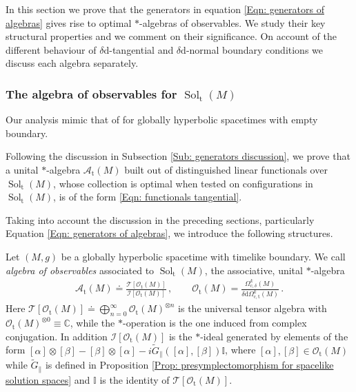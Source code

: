 In this section we prove that the generators in equation \eqref{Eqn: generators of algebras} gives rise to optimal $*$-algebras of observables. We study their key structural properties and we comment on their significance. On account of the different behaviour of $\delta\mathrm{d}$-tangential and $\delta\mathrm{d}$-normal boundary conditions we discuss each algebra separately.

\subsubsection{The algebra of observables for $\operatorname{Sol}_{\mathrm{t}}(M)$}\label{Sec: the alg of obs for deltad-tangential bc}

Our analysis mimic that of \cite{Benini-16,Dappiaggi:2011cj,Hack-Schenkel-13,Dappiaggi-Hack-Sanders-14} for globally hyperbolic spacetimes with empty boundary.

Following the discussion in Subsection \ref{Sub: generators discussion}, we prove that a unital $*$-algebra $\mathcal{A}_{\mathrm{t}}(M)$ built out of distinguished linear functionals over $\operatorname{Sol}_{\mathrm{t}}(M)$, whose collection is optimal when tested on configurations in $\operatorname{Sol}_{\mathrm{t}}(M)$, is of the form \eqref{Eqn: functionals tangential}.

Taking into account the discussion in the preceding sections, particularly Equation \eqref{Eqn: generators of algebras}, we introduce the following structures.

\begin{Definition}\label{Def: alg of obs for deltad-tangential bc}
	Let $(M,g)$ be a globally hyperbolic spacetime with timelike boundary.
	We call {\em algebra of observables} associated to $\operatorname{Sol}_{\mathrm{t}}(M)$, the associative, unital $*$-algebra 
	\begin{align}\label{Eqn: alg of obs for deltad-tangential bc}
	\mathcal{A}_{\mathrm{t}}(M)\doteq\frac{\mathcal{T}[\mathcal{O}_{\mathrm{t}}(M)]}{\mathcal{I}[\mathcal{O}_{\mathrm{t}}(M)]}\,,\qquad
	\mathcal{O}_{\mathrm{t}}(M)=\frac{\Omega_{\mathrm{c},\delta}^k(M)}{\delta\mathrm{d}\Omega_{\mathrm{c,t}}^k(M)}\,.
	\end{align}
	Here $\mathcal{T}[\mathcal{O}_{\mathrm{t}}(M)]\doteq\bigoplus_{n=0}^\infty\mathcal{O}_{\mathrm{t}}(M)^{\otimes n}$ is the universal tensor algebra with
	$\mathcal{O}_{\mathrm{t}}(M)^{\otimes 0}\equiv\mathbb{C}$, while the $*$-operation is the one induced from complex conjugation.
	In addition $\mathcal{I}[\mathcal{O}_{\mathrm{t}}(M)]$ is the $*$-ideal generated by elements of the form
	$[\alpha]\otimes[\beta]-[\beta]\otimes[\alpha]-i \widetilde{G}_\parallel([\alpha],[\beta])\mathbb{I}$, where $[\alpha],[\beta]\in\mathcal{O}_{\mathrm{t}}(M)$ while $\widetilde{G}_\parallel$ is defined in Proposition \ref{Prop: presymplectomorphism for spacelike solution spaces} and $\mathbb{I}$ is the identity of $\mathcal{T}[\mathcal{O}_{\mathrm{t}}(M)]$.
\end{Definition}

